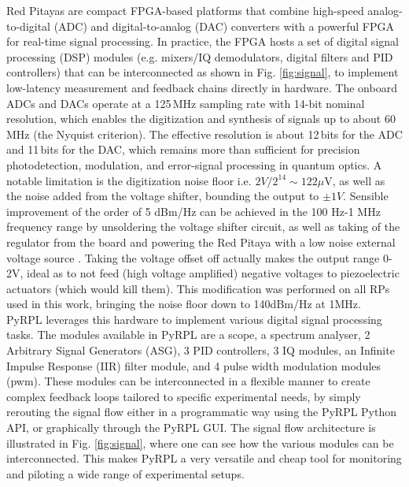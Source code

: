 Red Pitayas are compact FPGA-based platforms that combine high-speed analog-to-digital (ADC) and digital-to-analog (DAC) converters with a powerful FPGA for real-time signal processing. In practice, the FPGA hosts a set of digital signal processing (DSP) modules (e.g. mixers/IQ demodulators, digital filters and PID controllers) that can be interconnected as shown in Fig. \ref{fig:signal}, to implement low-latency measurement and feedback chains directly in hardware. The onboard ADCs and DACs operate at a 125\,MHz sampling rate with 14-bit nominal resolution, which enables the digitization and synthesis of signals up to about 60\,MHz (the Nyquist criterion). The effective resolution is about 12\,bits for the ADC and 11\,bits for the DAC, which remains more than sufficient for precision photodetection, modulation, and error-signal processing in quantum optics. A notable limitation is the digitization noise floor i.e. $2V/2^{14} \sim 122 \mu$V, as well as the noise added from the voltage shifter, bounding the output to $\pm 1V$. Sensible improvement of the order of 5 dBm/Hz can be achieved in the 100 Hz-1 MHz frequency range by unsoldering the voltage shifter circuit, as well as taking of the regulator from the board and powering the Red Pitaya with a low noise external voltage source \cite{neuhaus_blog}. Taking the voltage offset off actually makes the output range 0-2V, ideal as to not feed (high voltage amplified) negative voltages to piezoelectric actuators (which would kill them). This modification was performed on all RPs used in this work, bringing the noise floor down to 140dBm/Hz at 1MHz. \\

PyRPL leverages this hardware to implement various digital signal processing tasks. The modules available in PyRPL are a scope, a spectrum analyser, 2 Arbitrary Signal Generators (ASG), 3 PID controllers, 3 IQ modules, an Infinite Impulse Response (IIR) filter module, and 4 pulse width modulation modules (pwm). These modules can be interconnected in a flexible manner to create complex feedback loops tailored to specific experimental needs, by simply rerouting the signal flow either in a programmatic way using the PyRPL Python API, or graphically through the PyRPL GUI. The signal flow architecture is illustrated in Fig. \ref{fig:signal}, where one can see how the various modules can be interconnected. This makes PyRPL a very versatile and cheap tool for monitoring and piloting a wide range of experimental setups. \\

